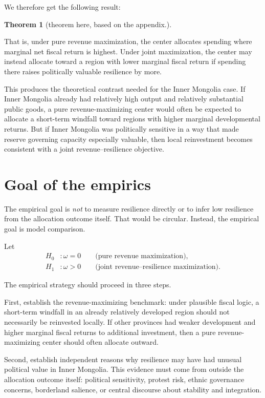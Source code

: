 \documentclass[12pt]{article}
\newtheorem{theorem}{Theorem}
\begin{document}
We therefore get the following result:

\begin{theorem}
    [theorem here, based on the appendix.]
\end{theorem}
That is, under pure revenue maximization, the center allocates spending where marginal net fiscal return is highest. Under joint maximization, the center may instead allocate toward a region with lower marginal fiscal return if spending there raises politically valuable resilience by more.

This produces the theoretical contrast needed for the Inner Mongolia case. If Inner Mongolia already had relatively high output and relatively substantial public goods, a pure revenue-maximizing center would often be expected to allocate a short-term windfall toward regions with higher marginal developmental returns. But if Inner Mongolia was politically sensitive in a way that made reserve governing capacity especially valuable, then local reinvestment becomes consistent with a joint revenue--resilience objective.

\section{Goal of the empirics}

The empirical goal is \emph{not} to measure resilience directly or to infer low resilience from the allocation outcome itself. That would be circular. Instead, the empirical goal is model comparison.

Let
\begin{align*}
H_0 &: \omega = 0 \qquad \text{(pure revenue maximization)},\\
H_1 &: \omega > 0 \qquad \text{(joint revenue--resilience maximization).}
\end{align*}

The empirical strategy should proceed in three steps.

First, establish the revenue-maximizing benchmark: under plausible fiscal logic, a short-term windfall in an already relatively developed region should not necessarily be reinvested locally. If other provinces had weaker development and higher marginal fiscal returns to additional investment, then a pure revenue-maximizing center should often allocate outward.

Second, establish independent reasons why resilience may have had unusual political value in Inner Mongolia. This evidence must come from outside the allocation outcome itself: political sensitivity, protest risk, ethnic governance concerns, borderland salience, or central discourse about stability and integration.
\end{document}
